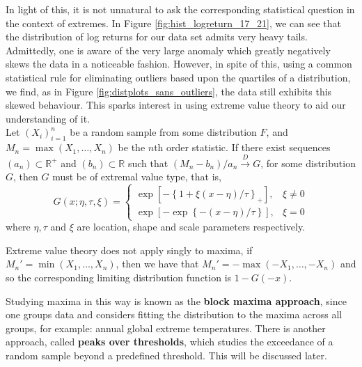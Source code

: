 \documentclass[twoside]{report}
\begin{document}
\begin{spacing}{1}
In light of this, it is not unnatural to ask the corresponding statistical question in the context of extremes. In Figure \ref{fig:hist_logreturn_17_21}, we can see that the distribution of log returns for our data set admits very heavy tails. Admittedly, one is aware of the very large anomaly which greatly negatively skews the data in a noticeable fashion. However, in spite of this, using a common statistical rule for eliminating outliers based upon the quartiles of a distribution, we find, as in Figure \ref{fig:distplots_sans_outliers}, the data still exhibits this skewed behaviour. This sparks interest in using extreme value theory to aid our understanding of it.\\

Let $(X_i)_{i=1}^n$ be a random sample from some distribution $F$, and $M_n = \max(X_1, \ldots, X_n)$ be the $n$th order statistic. If there exist sequences $(a_n) \subset \mathbb{R}^+$ and $(b_n) \subset \mathbb{R}$ such that $(M_n - b_n)/a_n \overset{D}{\to} G$, for some distribution $G$, then $G$ must be of extremal value type, that is, \[
G(x; \eta, \tau, \xi) = \begin{cases}
\exp\left[-\left\{1+\xi(x-\eta)/\tau\right\}_+\right], & \xi \ne 0\\
\exp\left[-\exp\left\{-(x-\eta)/\tau\right\}\right], & \xi = 0
\end{cases}
\]
where $\eta, \tau$ and $\xi$ are location, shape and scale parameters respectively. \begin{remark}
Extreme value theory does not apply singly to maxima, if $M_n' = \min(X_1, \ldots, X_n)$, then we have that $M_n' = -\max(-X_1, \ldots, -X_n)$ and so the corresponding limiting distribution function is $1-G(-x)$. 
\end{remark}

Studying maxima in this way is known as the \textbf{block maxima approach}, since one groups data and considers fitting the distribution to the maxima across all groups, for example: annual global extreme temperatures. There is another approach, called \textbf{peaks over thresholds}, which studies the exceedance of a random sample beyond a predefined threshold. This will be discussed later.



\end{spacing}
\end{document}
